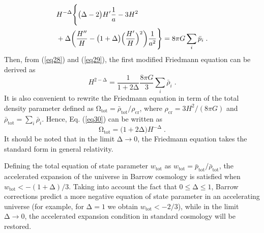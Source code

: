 \documentclass[11pt,twocolumn]{article}
\begin{document}
    \begin{align} \label{eq29}
    &H^{-\mathrm{\Delta}}\Bigg{\{}\big(\mathrm{\Delta}-2\big) H' \frac{1}{a}-3H^2 \nonumber \\
    &+\mathrm{\Delta}\bigg(\frac{H''}{H}-\big(1+\mathrm{\Delta}\big)\Big(\frac{H'}{H}\Big)^2\bigg)\frac{1}{a^2}\Bigg{\}}=8\pi G \sum_{i}\bar{p}_i \;.
    \end{align}
Then, from (\ref{eq28}) and (\ref{eq29}), the first modified
Friedmann equation can be derived as
    \begin{equation} \label{eq30}
    H^{2-\mathrm{\Delta}}=\frac{1}{1+2\mathrm{\Delta}}\frac{8\pi G}{3}\sum_{i}\bar{\rho}_i \;.
    \end{equation}
It is also convenient to rewrite the Friedmann equation in term of the
total density parameter defined as
$\mathrm{\Omega}_\mathrm{tot}=\bar{\rho}_\mathrm{tot}/\rho_\mathrm{cr}$,
where $\rho_\mathrm{cr}={3H^2}/{(8\pi G)}$ and
$\bar{\rho}_\mathrm{tot}=\sum_{i}\bar{\rho}_i$. Hence, Eq.
(\ref{eq30}) can be written as
    \begin{equation} \label{eq31}
    \mathrm{\Omega}_\mathrm{tot}=\big(1+2\mathrm{\Delta}\big)H^{-\mathrm{\Delta}} \;.
    \end{equation}
It should be noted that in the limit $\mathrm{\Delta} \to0$, the Friedmann
equation takes the standard form in general relativity.

Defining the total equation of state parameter $w_\mathrm{tot}$ as
$w_\mathrm{tot}=\bar{p}_\mathrm{tot}/\bar{\rho}_\mathrm{tot}$, the
accelerated expansion of the universe in Barrow cosmology is satisfied
when \mbox{$w_\mathrm{tot}<-(1+\mathrm{\Delta})/3$}. Taking into account
the fact that $0 \le \mathrm{\Delta} \le 1$, Barrow corrections predict a
more negative equation of state parameter in an accelerating
universe (for example, for $\mathrm{\Delta}=1$ we obtain
$w_\mathrm{tot}<-2/3$), while in the limit $\mathrm{\Delta} \to0$, the
accelerated expansion condition in standard cosmology will be
restored.
\end{document}

